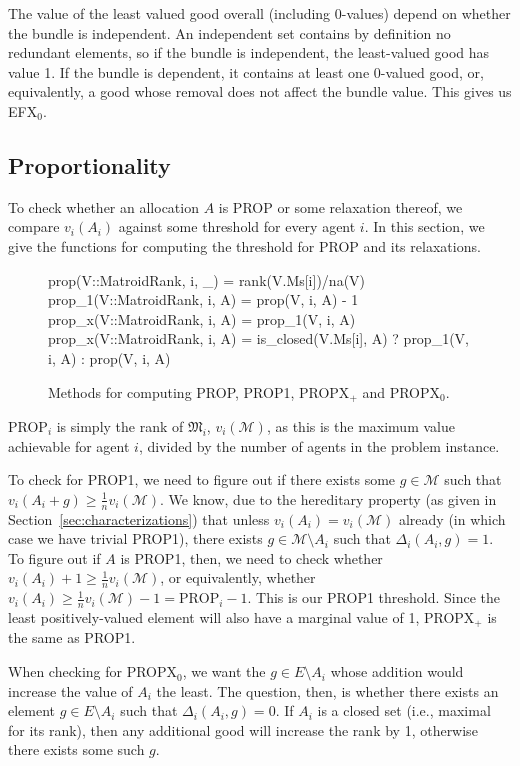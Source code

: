 The value of the least valued good overall (including 0-values) depend on whether the bundle is independent. An independent set contains by definition no redundant elements, so if the bundle is independent, the least-valued good has value 1. If the bundle is dependent, it contains at least one 0-valued good, or, equivalently, a good whose removal does not affect the bundle value. This gives us EFX$_0$.

\subsection*{Proportionality}
To check whether an allocation $A$ is PROP or some relaxation thereof, we compare $v_i(A_i)$ against some threshold for every agent $i$. In this section, we give the functions for computing the threshold for PROP and its relaxations.

\begin{figure}[ht!]
\begin{jllisting}
prop(V::MatroidRank, i, _) = rank(V.Ms[i])/na(V)
prop_1(V::MatroidRank, i, A) = prop(V, i, A) - 1
prop_x(V::MatroidRank, i, A) = prop_1(V, i, A)
prop_x(V::MatroidRank, i, A) = 
    is_closed(V.Ms[i], A) ? prop_1(V, i, A) : prop(V, i, A)
\end{jllisting}
\caption{Methods for computing PROP, PROP1, PROPX$_+$ and PROPX$_0$.}
\end{figure}

PROP$_i$ is simply the rank of $\mathfrak{M}_i$, $v_i(\mathcal{M})$, as this is the maximum value achievable for agent $i$, divided by the number of agents in the problem instance.

To check for PROP1, we need to figure out if there exists some $g\in\mathcal{M}$ such that $v_i(A_i+g)\geq \frac{1}{n}v_i(\mathcal{M})$. We know, due to the hereditary property (as given in Section~\ref{sec:characterizations}) that unless $v_i(A_i) = v_i(\mathcal{M})$ already (in which case we have trivial PROP1), there exists $g\in\mathcal{M}\setminus A_i$ such that $\Delta_i(A_i, g) = 1$. To figure out if $A$ is PROP1, then, we need to check whether $v_i(A_i) + 1 \geq \frac{1}{n}v_i(\mathcal{M})$, or equivalently, whether $v_i(A_i) \geq \frac{1}{n}v_i(\mathcal{M})-1 = \text{PROP}_i - 1$. This is our PROP1 threshold. Since the least positively-valued element will also have a marginal value of 1, PROPX$_+$ is the same as PROP1.

When checking for PROPX$_0$, we want the $g\in E\setminus A_i$ whose addition would increase the value of $A_i$ the least. The question, then, is whether there exists an element $g\in E\setminus A_i$ such that $\Delta_i(A_i, g) = 0$. If $A_i$ is a closed set (i.e., maximal for its rank), then any additional good will increase the rank by 1, otherwise there exists some such $g$.

